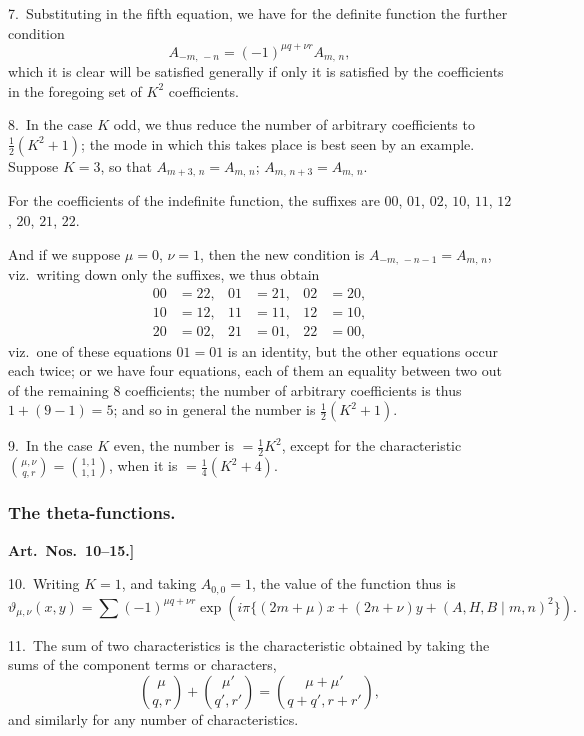 \documentclass[11pt,a4paper]{article}
\theoremstyle{definition}
\begin{document}
7.\ Substituting in the fifth equation, we have for the definite function the further condition
\[
A_{-m,\,-n} = (-1)^{\mu q + \nu r}A_{m,\,n},
\]
which it is clear will be satisfied generally if only it is satisfied by the coefficients in the foregoing set of $K^2$ coefficients.

\medskip

8.\ In the case $K$ odd, we thus reduce the number of arbitrary coefficients to $\frac{1}{2}(K^2 + 1)$; the mode in which this takes place is best seen by an example. Suppose $K = 3$, so that $A_{m+3,\,n} = A_{m,\,n}$; $A_{m,\,n+3} = A_{m,\,n}$.

For the coefficients of the indefinite function, the suffixes are $00$, $01$, $02$, $10$, $11$, $12$, $20$, $21$, $22$.

And if we suppose $\mu = 0$, $\nu = 1$, then the new condition is $A_{-m,\,-n-1} = A_{m,\,n}$, viz.\ writing down only the suffixes, we thus obtain
\begin{align*}
00 &= 22, & 01 &= 21, & 02 &= 20,\\
10 &= 12, & 11 &= 11, & 12 &= 10,\\
20 &= 02, & 21 &= 01, & 22 &= 00,
\end{align*}
viz.\ one of these equations $01 = 01$ is an identity, but the other equations occur each twice; or we have four equations, each of them an equality between two out of the remaining 8 coefficients; the number of arbitrary coefficients is thus $1 + (9 - 1) = 5$; and so in general the number is $\frac{1}{2}(K^2 + 1)$.

\medskip

9.\ In the case $K$ even, the number is $= \frac{1}{2}K^2$, except for the characteristic $\binom{\mu, \nu}{q, r} = \binom{1, 1}{1, 1}$, when it is $= \frac{1}{4}(K^2 + 4)$.

\subsubsection*{The theta-functions.}

\textbf{Art.~Nos.~10--15.]
}

10.\ Writing $K = 1$, and taking $A_{0,0} = 1$, the value of the function thus is
\[
\vartheta_{\mu,\nu}(x, y) = \sum (-1)^{\mu q + \nu r}\exp(i\pi\{(2m + \mu)x + (2n + \nu)y + (A, H, B \mid m, n)^2\}).
\]

\medskip

11.\ The sum of two characteristics is the characteristic obtained by taking the sums of the component terms or characters,
\[
\binom{\mu}{q, r} + \binom{\mu'}{q', r'} = \binom{\mu + \mu'}{q + q', r + r'},
\]
and similarly for any number of characteristics.
\end{document}
